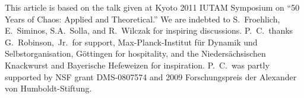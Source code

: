 \begin{acknowledgments}
This article is based on the talk given at
Kyoto 2011 IUTAM Symposium on ``50 Years of Chaos: Applied and Theoretical.''
We are indebted to
S.~Froehlich,
E.~Siminos,
S.A.~Solla,
and
R.~Wilczak
for inspiring discussions.
P.~C.\ thanks G.~Robinson,~Jr.\ for support,
Max-Planck-Institut f\"ur Dynamik und Selbstorganisation,
G\"ottingen for hospitality,
and the Nieders\"achsischen Knackwurst and Bayerische Hefeweizen for inspiration.
P.~C.\ was partly supported by NSF grant DMS-0807574
and
2009 Forschungspreis der Alexander von Humboldt-Stiftung.
\end{acknowledgments}
